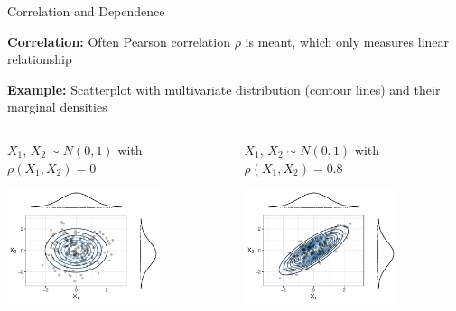 \documentclass[11pt,compress,t,notes=noshow, aspectratio=169, xcolor=table]{beamer}
\begin{document}
\begin{frame}{Correlation and Dependence}

\textbf{Correlation:} Often Pearson correlation $\rho$ is meant, which only measures linear relationship %

\textbf{Example:} Scatterplot with multivariate distribution (contour lines) and their marginal densities
\vspace{5pt}
\begin{columns}[totalwidth=\textwidth]
\begin{column}{0.5\linewidth}
\centering
$X_1$, $X_2 \sim N(0,1)$ with $\rho(X_1, X_2) = 0$

\includegraphics[width = 0.7\textwidth]{figure/independent}
\end{column}
\begin{column}{0.5\linewidth}
\centering
$X_1$, $X_2 \sim N(0,1)$ with $\rho(X_1, X_2) = 0.8$

\includegraphics[width = 0.7\textwidth]{figure/dependent}
\end{column}
\end{columns}



\end{frame}
\end{document}

